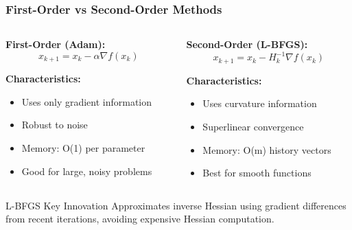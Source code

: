 \documentclass[notes]{beamer}
\begin{document}
\begin{frame}
\frametitle{First-Order vs Second-Order Methods}

\begin{columns}[T]
    \begin{column}{0.5\textwidth}
        \textbf{First-Order (Adam):}
        \begin{equation*}
        x_{k+1} = x_k - \alpha \nabla f(x_k)
        \end{equation*}
        
        \textbf{Characteristics:}
        \begin{itemize}
            \item Uses only gradient information
            \item Robust to noise
            \item Memory: O(1) per parameter
            \item Good for large, noisy problems
        \end{itemize}
    \end{column}
    \begin{column}{0.5\textwidth}
        \textbf{Second-Order (L-BFGS):}
        \begin{equation*}
        x_{k+1} = x_k - H_k^{-1} \nabla f(x_k)
        \end{equation*}
        
        \textbf{Characteristics:}
        \begin{itemize}
            \item Uses curvature information
            \item Superlinear convergence
            \item Memory: O(m) history vectors
            \item Best for smooth functions
        \end{itemize}
    \end{column}
\end{columns}

\vspace{1cm}

\begin{alertblock}{L-BFGS Key Innovation}
Approximates inverse Hessian using gradient differences from recent iterations, avoiding expensive Hessian computation.
\end{alertblock}

\end{frame}
\end{document}

